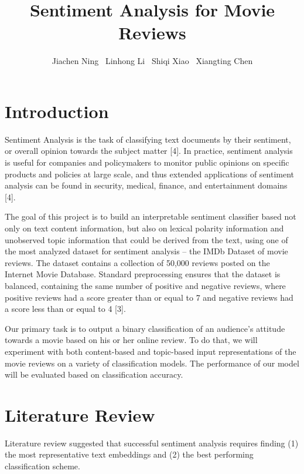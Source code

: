 \documentclass{article}
\title{Sentiment Analysis for Movie Reviews}
\author{%
  Jiachen Ning \ Linhong Li \ Shiqi Xiao \ Xiangting Chen 
}
\begin{document}

\maketitle

\section{Introduction}

Sentiment Analysis is the task of classifying text documents by their sentiment, or overall opinion towards the subject matter [4]. In practice, sentiment analysis is useful for companies and policymakers to monitor public opinions on specific products and policies at large scale, and thus extended applications of sentiment analysis can be found in security, medical, finance, and entertainment domains [4].

The goal of this project is to build an interpretable sentiment classifier based not only on text content information, but also on lexical polarity information and unobserved topic information that could be derived from the text, using one of the most analyzed dataset for sentiment analysis -- the IMDb Dataset of movie reviews. The dataset contains a collection of 50,000 reviews posted on the Internet Movie Database. Standard preprocessing ensures that the dataset is balanced, containing the same number of positive and negative reviews, where positive reviews had a score greater than or equal to 7 and negative reviews had a score less than or equal to 4 [3]. 

Our primary task is to output a binary classification of an audience's attitude towards a movie based on his or her online review. To do that, we will experiment with both content-based and topic-based input representations of the movie reviews on a variety of classification models. The performance of our model will be evaluated based on classification accuracy.



\section{Literature Review}

Literature review suggested that successful sentiment analysis requires finding (1) the most representative text embeddings and (2) the best performing classification scheme. 
\end{document}
